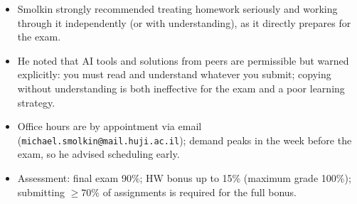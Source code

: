 \begin{itemize}
  \item Smolkin strongly recommended treating homework seriously and
    working through it independently (or with understanding), as it
    directly prepares for the exam.
  \item He noted that AI tools and solutions from peers are
    permissible but warned explicitly: you must read and understand
    whatever you submit; copying without understanding is both
    ineffective for the exam and a poor learning strategy.
  \item Office hours are by appointment via email
    (\texttt{michael.smolkin@mail.huji.ac.il}); demand peaks in the
    week before the exam, so he advised scheduling early.
  \item Assessment: final exam 90\%; HW bonus up to 15\% (maximum
    grade 100\%); submitting $\geq 70\%$ of assignments is required
    for the full bonus.
\end{itemize}
